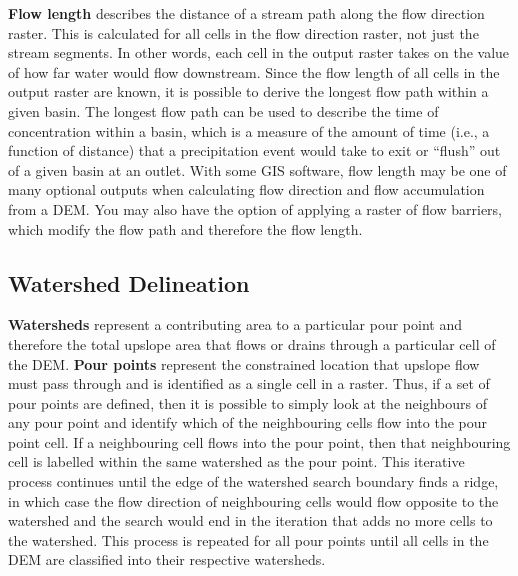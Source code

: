 \documentclass[
]{book}
\begin{document}
\textbf{Flow length} describes the distance of a stream path along the flow direction raster. This is calculated for all cells in the flow direction raster, not just the stream segments. In other words, each cell in the output raster takes on the value of how far water would flow downstream. Since the flow length of all cells in the output raster are known, it is possible to derive the longest flow path within a given basin. The longest flow path can be used to describe the time of concentration within a basin, which is a measure of the amount of time (i.e., a function of distance) that a precipitation event would take to exit or ``flush'' out of a given basin at an outlet. With some GIS software, flow length may be one of many optional outputs when calculating flow direction and flow accumulation from a DEM. You may also have the option of applying a raster of flow barriers, which modify the flow path and therefore the flow length.

\subsection{Watershed Delineation}\label{watershed-delineation}

\textbf{Watersheds} represent a contributing area to a particular pour point and therefore the total upslope area that flows or drains through a particular cell of the DEM. \textbf{Pour points} represent the constrained location that upslope flow must pass through and is identified as a single cell in a raster. Thus, if a set of pour points are defined, then it is possible to simply look at the neighbours of any pour point and identify which of the neighbouring cells flow into the pour point cell. If a neighbouring cell flows into the pour point, then that neighbouring cell is labelled within the same watershed as the pour point. This iterative process continues until the edge of the watershed search boundary finds a ridge, in which case the flow direction of neighbouring cells would flow opposite to the watershed and the search would end in the iteration that adds no more cells to the watershed. This process is repeated for all pour points until all cells in the DEM are classified into their respective watersheds.
\end{document}
